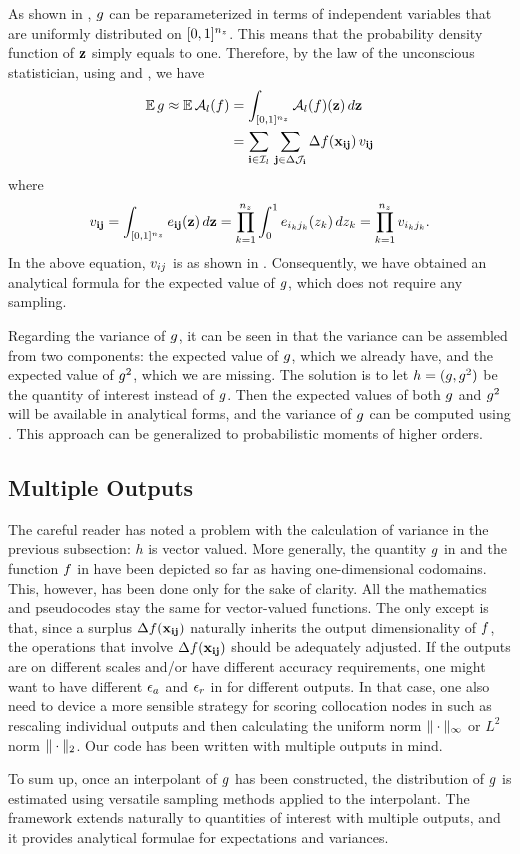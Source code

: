 As shown in , $g$ can be reparameterized in terms of
independent variables that are uniformly distributed on $[0, 1]^{n_z}$. This means
that the probability density function of $\mathbf{z}$ simply equals to one. Therefore,
by the law of the unconscious statistician, using  and
, we have
\begin{align*}
  \mathbb{E} \, g \approx \mathbb{E} \, \mathcal{A}_{l}(f) &= \int_{[0, 1]^{n_z}} \mathcal{A}_{l}(f)(\mathbf{z}) \, d\mathbf{z} \\
  &= \sum_{\mathbf{i} \in \mathcal{I}_l} \, \sum_{\mathbf{j} \in \Delta\mathcal{J}_{\mathbf{i}}} \Delta f(\mathbf{x}_{\mathbf{i}\mathbf{j}}) \, v_{\mathbf{i}\mathbf{j}}
\end{align*}
where
\[
  v_{\mathbf{i}\mathbf{j}} = \int_{[0, 1]^{n_z}} e_{\mathbf{i}\mathbf{j}}(\mathbf{z}) \, d\mathbf{z} = \prod_{k = 1}^{{n_z}} \int_0^1 e_{i_k j_k}(z_k) \, dz_k = \prod_{k = 1}^{{n_z}} v_{i_k j_k}.
\]
In the above equation, $v_{ij}$ is as shown in . Consequently, we
have obtained an analytical formula for the expected value of $g$, which does
not require any sampling.

Regarding the variance of $g$, it can be seen in  that the
variance can be assembled from two components: the expected value of $g$, which
we already have, and the expected value of $g^2$, which we are missing. The
solution is to let $h = (g, g^2)$ be the quantity of interest instead of $g$.
Then the expected values of both $g$ and $g^2$ will be available in analytical
forms, and the variance of $g$ can be computed using . This
approach can be generalized to probabilistic moments of higher orders.

\subsection{Multiple Outputs}
The careful reader has noted a problem with the calculation of variance in the
previous subsection: $h$ is vector valued. More generally, the quantity $g$ in
 and the function $f$ in  have been depicted
so far as having one-dimensional codomains. This, however, has been done only
for the sake of clarity. All the mathematics and pseudocodes stay the same for
vector-valued functions. The only except is that, since a surplus
$\Delta f(\mathbf{x}_{\mathbf{i}\mathbf{j}})$ naturally inherits the output dimensionality of $f$,
the operations that involve $\Delta f(\mathbf{x}_{\mathbf{i}\mathbf{j}})$ should be adequately
adjusted. If the outputs are on different scales and/or have different accuracy
requirements, one might want to have different $\epsilon_a$ and $\epsilon_r$ in
 for different outputs. In that case, one also need to
device a more sensible strategy for scoring collocation nodes in 
such as rescaling individual outputs and then calculating the uniform norm
$\| \cdot \|_\infty$ or $L^2$ norm $\| \cdot \|_2$. Our code \cite{sources}
has been written with multiple outputs in mind.

To sum up, once an interpolant of $g$ has been constructed, the distribution of
$g$ is estimated using versatile sampling methods applied to the interpolant.
The framework extends naturally to quantities of interest with multiple outputs,
and it provides analytical formulae for expectations and variances.

